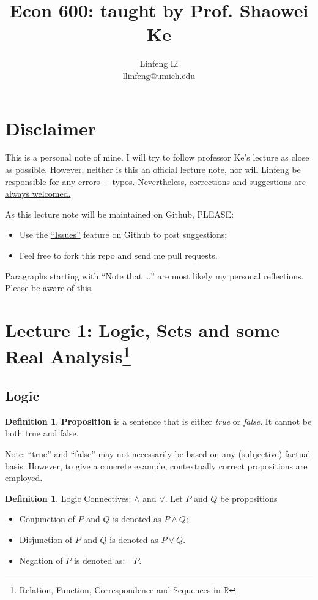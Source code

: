 \documentclass[12pt]{article}
\title{Econ 600: taught by Prof. Shaowei Ke}
\author{Linfeng Li \\ llinfeng@umich.edu}
\newcommand{\R}{{\mathbb R}}
\theoremstyle{definition}
\newtheorem{definition}[theorem]{Definition}
\theoremstyle{plain}
\begin{document}
\maketitle

\section*{Disclaimer}
This is a personal note of mine. I will try to follow professor Ke's lecture as 
close as possible. However, neither is this an official lecture note, nor will 
Linfeng be responsible for any errors + typos. 
\underline{Nevertheless, corrections and suggestions are always welcomed.}

\smallskip

As this lecture note will be maintained on Github, PLEASE: 
\begin{itemize}
    \item Use the \href{https://github.com/llinfeng/Econ_600/issues}{``Issues''} feature on Github to post suggestions;
    \item Feel free to fork this repo and send me pull requests.
\end{itemize}
Paragraphs starting with ``Note that \ldots'' are most likely my personal 
reflections. Please be aware of this.

\section{Lecture 1: Logic, Sets and some Real Analysis\footnote{Relation, 
Function, Correspondence and Sequences in $\R$}}

\subsection{Logic}
\begin{definition}
    \textbf{Proposition} is a sentence that is either \textit{true} or 
    \textit{false}. It cannot be both true and false.
\end{definition}
Note: ``true'' and ``false'' may not necessarily be based on any (subjective) 
factual basis. However, to give a concrete example, contextually correct 
propositions are employed.

\begin{definition}
    Logic Connectives: $\land$ and $\lor$. Let $P$ and $Q$ be propositions 
    \begin{itemize}
        \item Conjunction of $P$ and $Q$ is denoted as $P \land Q$;
        \item Disjunction of $P$ and $Q$ is denoted as $P \lor  Q$.
        \item Negation of $P$ is denoted as: $\neg P$.
    \end{itemize}
\end{definition}
\end{document}
